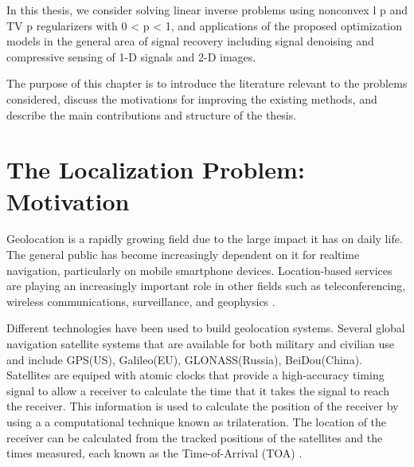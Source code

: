 \label{chapter:introduction}


In this thesis, we consider solving linear inverse problems using nonconvex l p and TV p
regularizers with 0 < p < 1, and applications of the proposed optimization models in
the general area of signal recovery including signal denoising and compressive sensing
of 1-D signals and 2-D images. 

The purpose of this chapter is to introduce the
literature relevant to the problems considered, discuss the motivations for improving
the existing methods, and describe the main contributions and structure of the thesis.

\section{The Localization Problem: Motivation} \label{problem}

Geolocation is a rapidly growing field due to the large impact it has on daily life.  The general public has become increasingly dependent on it for realtime navigation, particularly on mobile smartphone devices. Location-based services are  playing an increasingly important role in other fields such as teleconferencing, wireless communications, surveillance, and geophysics \cite{SmithAbel, ShcauRob, Yao, Huang, CheungChan, LiHu, Cheung, Sayed, classMDS}.

Different technologies have been used to build geolocation systems. Several global navigation satellite systems that are available for both military and civilian use and include GPS(US), Galileo(EU), GLONASS(Russia), BeiDou(China). Satellites are equiped with atomic clocks that provide a high-accuracy timing signal to  allow a receiver to calculate the time that it takes the signal to reach the receiver. This information is used to calculate the position of the receiver by using a a computational technique known as trilateration. The location of the receiver can be calculated from the
tracked positions of the satellites and the times measured, each known as the Time-of-Arrival (TOA) \cite{GeoLoc}.


